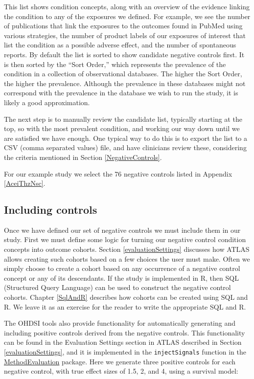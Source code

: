 \documentclass[11pt]{book}
\theoremstyle{definition}
\theoremstyle{definition}
\theoremstyle{definition}
\theoremstyle{remark}
\begin{document}
This list shows condition concepts, along with an overview of the evidence linking the condition to any of the exposures we defined. For example, we see the number of publications that link the exposures to the outcomes found in PubMed using various strategies, the number of product labels of our exposures of interest that list the condition as a possible adverse effect, and the number of spontaneous reports. By default the list is sorted to show candidate negative controls first. It is then sorted by the ``Sort Order,'' which represents the prevalence of the condition in a collection of observational databases. The higher the Sort Order, the higher the prevalence. Although the prevalence in these databases might not correspond with the prevalence in the database we wish to run the study, it is likely a good approximation.

The next step is to manually review the candidate list, typically starting at the top, so with the most prevalent condition, and working our way down until we are satisfied we have enough. One typical way to do this is to export the list to a CSV (comma separated values) file, and have clinicians review these, considering the criteria mentioned in Section \ref{NegativeControls}.

For our example study we select the 76 negative controls listed in Appendix \ref{AceiThzNsc}.

\hypertarget{including-controls}{%
\subsection{Including controls}\label{including-controls}}

Once we have defined our set of negative controls we must include them in our study. First we must define some logic for turning our negative control condition concepts into outcome cohorts. Section \ref{evaluationSettings} discusses how ATLAS allows creating such cohorts based on a few choices the user must make. Often we simply choose to create a cohort based on any occurrence of a negative control concept or any of its descendants. If the study is implemented in R, then SQL (Structured Query Language) can be used to construct the negative control cohorts. Chapter \ref{SqlAndR} describes how cohorts can be created using SQL and R. We leave it as an exercise for the reader to write the appropriate SQL and R.

The OHDSI tools also provide functionality for automatically generating and including positive controls derived from the negative controls. This functionality can be found in the Evaluation Settings section in ATLAS described in Section \ref{evaluationSettings}, and it is implemented in the \texttt{injectSignals} function in the \href{https://ohdsi.github.io/MethodEvaluation/}{MethodEvaluation} package. Here we generate three positive controls for each negative control, with true effect sizes of 1.5, 2, and 4, using a survival model:
\end{document}
